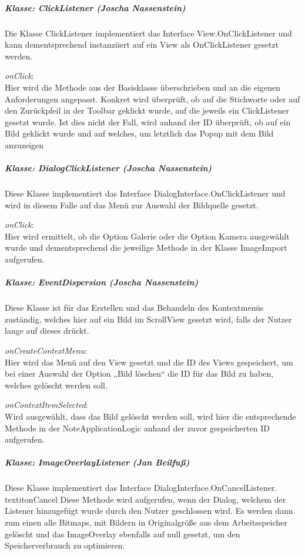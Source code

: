 \subparagraph*{Klasse: ClickListener (Joscha Nassenstein)}
Die Klasse ClickListener implementiert das Interface View.OnClickListener und kann dementsprechend instanziiert auf ein View als OnClickListener gesetzt werden.

\textit{onClick}:\\
Hier wird die Methode aus der Basisklasse überschrieben und an die eigenen Anforderungen angepasst. Konkret wird überprüft, ob auf die Stichworte oder auf den Zurückpfeil in der Toolbar geklickt wurde, auf die jeweils ein ClickListener gesetzt wurde. Ist dies nicht der Fall, wird anhand der ID überprüft, ob auf ein Bild geklickt wurde und auf welches, um letztlich das Popup mit dem Bild anzuzeigen

\subparagraph*{Klasse: DialogClickListener (Joscha Nassenstein)}
Diese Klasse implementiert das Interface DialogInterface.OnClickListener und wird in diesem Falle auf das Menü zur Auswahl der Bildquelle gesetzt.

\textit{onClick}:\\
Hier wird ermittelt, ob die Option Galerie oder die Option Kamera ausgewählt wurde und dementsprechend die jeweilige Methode in der Klasse ImageImport aufgerufen.

\subparagraph*{Klasse: EventDispersion (Joscha Nassenstein)}
Diese Klasse ist für das Erstellen und das Behandeln des Kontextmenüs zuständig, welches hier auf ein Bild im ScrollView gesetzt wird, falls der Nutzer lange auf dieses drückt.

\textit{onCreateContextMenu}:\\
Hier wird das Menü auf den View gesetzt und die ID des Views gespeichert, um bei einer Auswahl der Option „Bild löschen“ die ID für das Bild zu haben, welches gelöscht werden soll.

\textit{onContextItemSelected}:\\
Wird ausgewählt, dass das Bild gelöscht werden soll, wird hier die entsprechende Methode in der NoteApplicationLogic anhand der zuvor gespeicherten ID aufgerufen.

\subparagraph*{Klasse: ImageOverlayListener (Jan Beilfuß)}
Diese Klasse implementiert das Interface DialogInterface.OnCancelListener.
textit{onCancel}
Diese Methode wird aufgerufen, wenn der Dialog, welchem der Listener hinzugefügt wurde durch den Nutzer geschlossen wird. Es werden dann zum einen alle Bitmaps, mit Bildern in Originalgröße aus dem Arbeitsspeicher gelöscht und das ImageOverlay ebenfalls auf null gesetzt, um den Speicherverbrauch zu optimieren.

